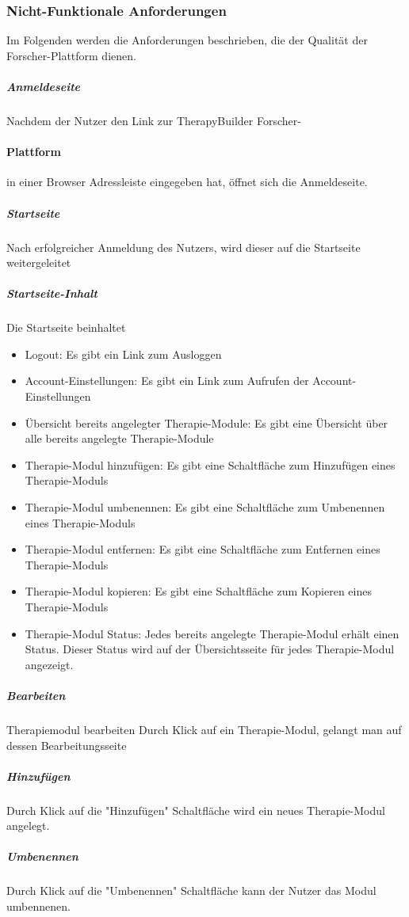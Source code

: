 \subsubsection{Nicht-Funktionale Anforderungen}
Im Folgenden werden die Anforderungen beschrieben, die der Qualität der Forscher-Plattform dienen.

\subparagraph{Anmeldeseite} Nachdem der Nutzer den Link zur TherapyBuilder Forscher-\paragraph{Plattform} in einer Browser Adressleiste eingegeben hat, öffnet sich die Anmeldeseite.

\subparagraph{Startseite}Nach erfolgreicher Anmeldung des Nutzers, wird dieser auf die Startseite weitergeleitet
\subparagraph{Startseite-Inhalt}Die Startseite beinhaltet
\begin{itemize}
\item Logout: Es gibt ein Link zum Ausloggen
\item Account-Einstellungen: Es gibt ein Link zum Aufrufen der Account-Einstellungen
\item Übersicht bereits angelegter Therapie-Module: Es gibt eine Übersicht über alle bereits angelegte Therapie-Module
\item Therapie-Modul hinzufügen: Es gibt eine Schaltfläche zum Hinzufügen eines Therapie-Moduls
\item Therapie-Modul umbenennen: Es gibt eine Schaltfläche zum Umbenennen eines Therapie-Moduls
\item Therapie-Modul entfernen: Es gibt eine Schaltfläche zum Entfernen eines Therapie-Moduls
\item  Therapie-Modul kopieren: Es gibt eine Schaltfläche zum Kopieren eines Therapie-Moduls
\item Therapie-Modul Status: Jedes bereits angelegte Therapie-Modul erhält einen Status. Dieser Status wird auf der Übersichtsseite für jedes Therapie-Modul angezeigt.
\end{itemize}
	
\subparagraph{Bearbeiten} Therapiemodul bearbeiten	Durch Klick auf ein Therapie-Modul, gelangt man auf dessen Bearbeitungsseite
		
\subparagraph{Hinzufügen}Durch Klick auf die "Hinzufügen" Schaltfläche wird ein neues Therapie-Modul angelegt.

\subparagraph{Umbenennen} Durch Klick auf die "Umbenennen" Schaltfläche kann der Nutzer das Modul umbennenen.

